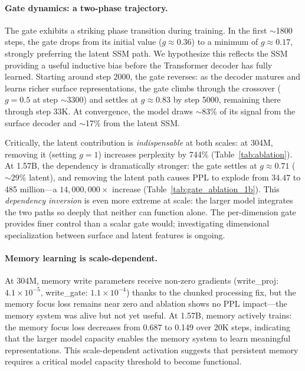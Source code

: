 \documentclass{article}
\begin{document}
\paragraph{Gate dynamics: a two-phase trajectory.}
The gate exhibits a striking phase transition during training. In the first
${\sim}$1800 steps, the gate drops from its initial value ($g \approx 0.36$)
to a minimum of $g \approx 0.17$, strongly preferring the latent SSM path. We
hypothesize this reflects the SSM providing a useful inductive bias before the
Transformer decoder has fully learned. Starting around step 2000, the gate
reverses: as the decoder matures and learns richer surface representations, the
gate climbs through the crossover ($g = 0.5$ at step ${\sim}$3300) and settles
at $g \approx 0.83$ by step 5000, remaining there through step 33K. At
convergence, the model draws ${\sim}$83\% of its signal from the surface
decoder and ${\sim}$17\% from the latent SSM.

Critically, the latent contribution is \emph{indispensable} at both scales:
at 304M, removing it (setting $g = 1$) increases perplexity by 744\%
(Table~\ref{tab:ablation}). At 1.57B, the dependency is dramatically
stronger: the gate settles at $g \approx 0.71$ (${\sim}29\%$ latent), and
removing the latent path causes PPL to explode from 34.47 to 485
million---a $14{,}000{,}000\times$ increase
(Table~\ref{tab:gate_ablation_1b}). This \emph{dependency inversion} is
even more extreme at scale: the larger model integrates the two paths so
deeply that neither can function alone. The per-dimension gate provides
finer control than a scalar gate would; investigating dimensional
specialization between surface and latent features is ongoing.

\paragraph{Memory learning is scale-dependent.}
At 304M, memory write parameters receive non-zero gradients (write\_proj:
$4.1 \times 10^{-5}$, write\_gate: $1.1 \times 10^{-4}$) thanks to the
chunked processing fix, but the memory focus loss remains near zero and
ablation shows no PPL impact---the memory system was alive but not yet useful.
At 1.57B, memory actively trains: the memory focus loss decreases from 0.687
to 0.149 over 20K steps, indicating that the larger model capacity enables
the memory system to learn meaningful representations. This scale-dependent
activation suggests that persistent memory requires a critical model capacity
threshold to become functional.
\end{document}
